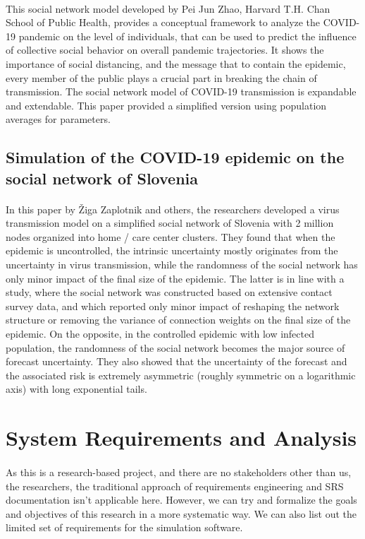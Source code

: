 \documentclass[12pt, a4paper]{extarticle}
\begin{document}
	        \paragraph{} This social network model developed by Pei Jun Zhao, Harvard T.H. Chan School of Public Health, provides a conceptual framework to analyze the COVID-19 pandemic on the level of individuals, that can be used to predict the influence of collective social behavior on overall pandemic trajectories. It shows the importance of social distancing, and the message that to contain the epidemic, every member of the public plays a crucial part in breaking the chain of transmission. The social network model of COVID-19 transmission is expandable and extendable. This paper provided a simplified version using population averages for parameters.
        \subsection{Simulation of the COVID-19 epidemic on the social network of Slovenia}
	        \paragraph{} In this paper by Žiga Zaplotnik and others, the researchers developed a virus transmission model on a simplified social network of Slovenia with 2 million nodes organized into home / care center clusters. They found that when the epidemic is uncontrolled, the intrinsic uncertainty mostly originates from the uncertainty in virus transmission, while the randomness of the social network has only minor impact of the final size of the epidemic. The latter is in line with a study, where the social network was constructed based on extensive contact survey data, and which reported only minor impact of reshaping the network structure or removing the variance of connection weights on the final size of the epidemic. On the opposite, in the controlled epidemic with low infected population, the randomness of the social network becomes the major source of forecast uncertainty. They also showed that the uncertainty of the forecast and the associated risk is extremely asymmetric (roughly symmetric on a logarithmic axis) with long exponential tails.

    \newpage
    \section{System Requirements and Analysis}
        \paragraph{} As this is a research-based project, and there are no stakeholders other than us, the researchers, the traditional approach of requirements engineering and SRS documentation isn't applicable here. However, we can try and formalize the goals and objectives of this research in a more systematic way. We can also list out the limited set of requirements for the simulation software.
\end{document}
